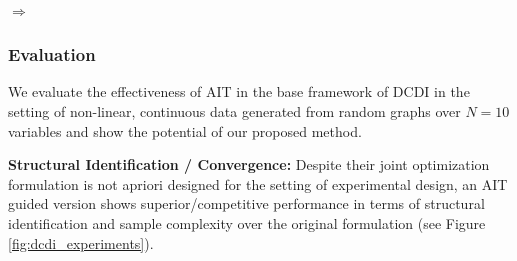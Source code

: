 \documentclass[nohyperref]{article}
\theoremstyle{plain}
\theoremstyle{definition}
\theoremstyle{remark}
\begin{document}
\begin{minipage}{0.4\textwidth}
    \begin{algorithm}[H]\small
        \caption{DCDI}\label{algorithm}
        \begin{algorithmic}[1]
            \item[]
        \end{algorithmic}
        \label{algo:DCDI}
    \end{algorithm}
\end{minipage}
\hfill
\begin{minipage}{0.05\textwidth}
\quad\vspace{6mm}\\
$\mathbf{\Rightarrow}$
\end{minipage}
\hfill
\begin{minipage}{0.53\textwidth}
    \begin{algorithm}[H]\small
        \caption{DCDI + AIT}\label{algorithm}
        \begin{algorithmic}[1]
            \item[]
            \EndFor
        \end{algorithmic}
        \label{algo:DCDI_AIT}
    \end{algorithm}
\end{minipage}

\subsubsection{Evaluation}
 We evaluate the effectiveness of AIT in the base framework of DCDI in the setting of non-linear, continuous data generated from random graphs over $N=10$ variables and show the potential of our proposed method.
 
 \textbf{Structural Identification / Convergence:} Despite their joint optimization formulation is not apriori designed for the setting of experimental design, an AIT guided version shows superior/competitive performance in terms of structural identification and sample complexity over the original formulation (see Figure \ref{fig:dcdi_experiments}). 
 
\end{document}
